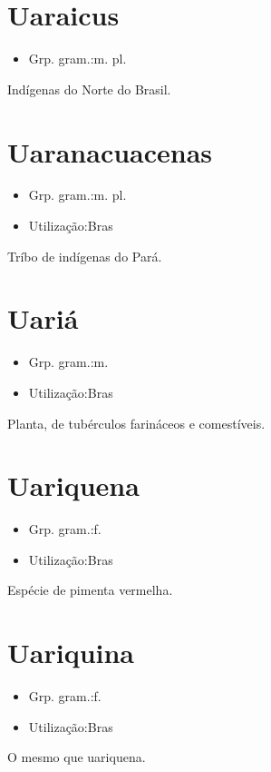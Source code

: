 \documentclass{article}
\begin{document}
\section{Uaraicus}
\begin{itemize}
\item {Grp. gram.:m. pl.}
\end{itemize}
Indígenas do Norte do Brasil.
\section{Uaranacuacenas}
\begin{itemize}
\item {Grp. gram.:m. pl.}
\end{itemize}
\begin{itemize}
\item {Utilização:Bras}
\end{itemize}
Tríbo de indígenas do Pará.
\section{Uariá}
\begin{itemize}
\item {Grp. gram.:m.}
\end{itemize}
\begin{itemize}
\item {Utilização:Bras}
\end{itemize}
Planta, de tubérculos farináceos e comestíveis.
\section{Uariquena}
\begin{itemize}
\item {Grp. gram.:f.}
\end{itemize}
\begin{itemize}
\item {Utilização:Bras}
\end{itemize}
Espécie de pimenta vermelha.
\section{Uariquina}
\begin{itemize}
\item {Grp. gram.:f.}
\end{itemize}
\begin{itemize}
\item {Utilização:Bras}
\end{itemize}
O mesmo que \textunderscore uariquena\textunderscore .
\end{document}
